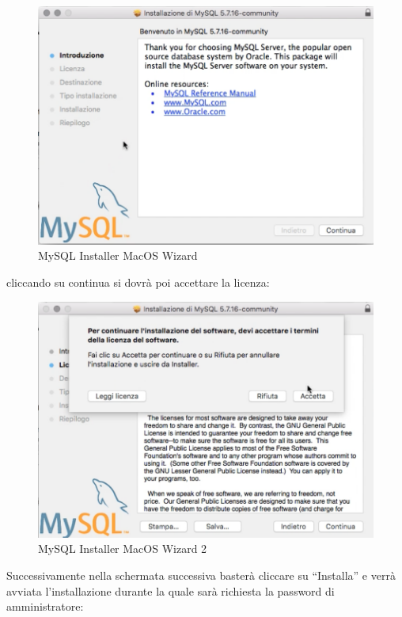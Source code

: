 \begin{itemize}
\begin{center}
\begin{figure}[H]
\centering
\includegraphics[scale=1]{figures/mySQLinstaller_macOS_wizard.png}
\caption{MySQL Installer MacOS Wizard}
\end{figure}
\end{center}

cliccando su continua si dovrà poi accettare la licenza:

\begin{center}
\begin{figure}[H]
\centering
\includegraphics[scale=1]{figures/mySQLinstaller_macOS_wizard2.png}
\caption{MySQL Installer MacOS Wizard 2}
\end{figure}
\end{center}

Successivamente nella schermata successiva basterà cliccare su “Installa” e verrà avviata l’installazione durante la quale sarà richiesta la password di amministratore: 


\end{itemize}
